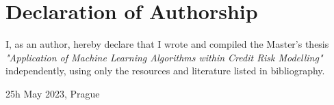 \vfill

\vglue 14cm

\section*{Declaration of Authorship}
I, as an author, hereby declare that I wrote and compiled the Master's thesis {\it{"Application of Machine Learning Algorithms within Credit Risk Modelling"}} independently, using only the resources and literature listed in bibliography.

\bigskip 

\vspace{0.5cm}


\begin{flushleft}
25h May 2023, Prague 
\end{flushleft}
\vspace{-0.5cm}
\begin{flushright}
\AuthorDP
\end{flushright}

